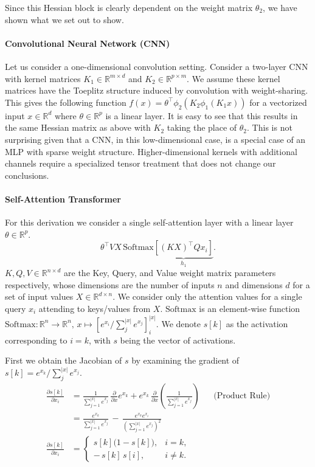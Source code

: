 \documentclass{article}
\theoremstyle{plain}
\theoremstyle{definition}
\theoremstyle{remark}
\begin{document}
Since this Hessian block is clearly dependent on the weight matrix $\theta_2$, we have shown what we set out to show.

\paragraph{Convolutional Neural Network (CNN)} Let us consider a one-dimensional convolution setting. Consider a two-layer CNN with kernel matrices $K_1 \in \mathbb{R}^{m \times d}$ and $K_2 \in \mathbb{R}^{p \times m}$. We assume these kernel matrices have the Toeplitz structure induced by convolution with weight-sharing. This gives the following function \(f(x) = \theta^{\top} \phi_2\left(K_2 \phi_1 \left(  K_1x \right) \right) \) for a vectorized input $x \in \mathbb{R}^d$ where $\theta \in \mathbb{R}^p$ is a linear layer. It is easy to see that this results in the same Hessian matrix as above with $K_2$ taking the place of $\theta_2$. This is not surprising given that a CNN, in this low-dimensional case, is a special case of an MLP with sparse weight structure. Higher-dimensional kernels with additional channels require a specialized tensor treatment that does not change our conclusions.

\paragraph{Self-Attention Transformer} For this derivation we consider a single self-attention layer with a linear layer $\theta \in \mathbb{R}^{p}$. 
\begin{equation*}
\theta^{\top}VX\,\mathrm{Softmax}\underbrace{\left[(KX)^{\top}Qx_i
\right]}_{h_1}.
\end{equation*}
$K, Q, V \in \mathbb{R}^{n \times d}$ are the Key, Query, and Value weight matrix parameters respectively, whose dimensions are the number of inputs $n$ and dimensions $d$ for a set of input values $X \in \mathbb{R}^{d \times n}$. We consider only the attention values for a single query $x_i$ attending to keys/values from $X$. $\mathrm{Softmax}$ is an element-wise function $\mathrm{Softmax}: \mathbb{R}^n \to \mathbb{R}^n,\, x \mapsto [e^{x_i}/\sum_j^{|x|} e^{x_j}]_i^{|x|}$. We denote $s[k]$ as the activation corresponding to $i = k$, with $s$ being the vector of activations.

First we obtain the Jacobian of $s$ by examining the gradient of $s[k] = e^{x_k}/\sum_j^{|x|} e^{x_j}$. 
\begin{align*}
\frac{\partial s[k]}{\partial x_i} 
&= \frac{1}{\sum_{j=1}^{|x|} e^{x_j}} \, \frac{\partial}{\partial x} e^{x_k} 
   + e^{x_k} \, \frac{\partial}{\partial x} \left(\frac{1}{\sum_{j=1}^{|x|} e^{x_j}}\right) 
   && \text{(Product Rule)} \\
&= \frac{e^{x_k}}{\sum_{j=1}^{|x|} e^{x_j}} \,
   -  \,  \frac{ e^{x_k}  e^{x_i}}{\left( \sum_{j=1}^{|x|}  e^{x_j}\right)^2}
   \\
\frac{\partial s[k]}{\partial x_i} 
&= \begin{cases}
s[k]\bigl(1 - s[k]\bigr), & i = k, \\[6pt]
-\,s[k]\,s[i], & i \neq k.
\end{cases}
\end{align*}
\end{document}
